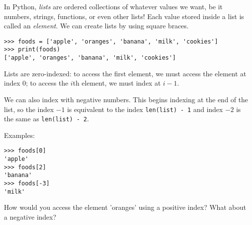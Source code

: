 
In Python, \textit{lists} are ordered collections of whatever values we want, be it numbers, strings, functions, or even other lists! Each value stored inside a list is called an \textit{element}. We can create lists by using square braces.


\begin{lstlisting}
>>> foods = ['apple', 'oranges', 'banana', 'milk', 'cookies']
>>> print(foods)
['apple', 'oranges', 'banana', 'milk', 'cookies']
\end{lstlisting}


Lists are zero-indexed: to access the first element, we must access the element at index 0;  to access the $i$th element, we must index at $i - 1$.

We can also index with negative numbers. This begins indexing at the end of the list, so the index $-1$ is equivalent to the index \texttt{len(list) - 1} and index $-2$ is the same as \texttt{len(list) - 2}.

Examples:
\begin{lstlisting}
>>> foods[0]
'apple'
>>> foods[2]
'banana'
>>> foods[-3] 
'milk'
\end{lstlisting}

 How would you access the element 'oranges' using a positive index? What about a negative index?


